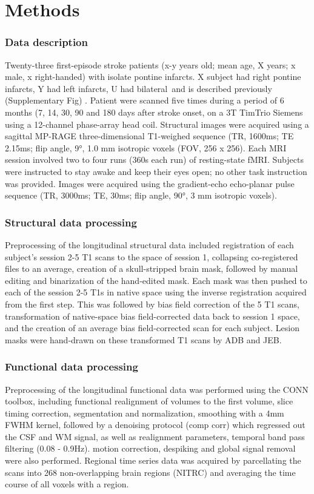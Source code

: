 \documentclass[10pt]{article}
\begin{document}
	\section*{Methods} \label{sec:firstpage}
	
	\subsubsection*{Data description}
	 Twenty-three first-episode stroke patients (x-y years old; mean age, X years; x male, x right-handed) with isolate pontine infarcts. X subject had right pontine infarcts, Y had left infarcts, U had bilateral and is described previously (Supplementary Fig) \cite{Lu2011-ow}. Patient were scanned five times during a period of 6 months (7, 14, 30, 90 and 180 days after stroke onset, on a 3T TimTrio Siemens using a 12-channel phase-array head coil. Structural images were acquired using a sagittal MP-RAGE three-dimensional T1-weighed sequence (TR, 1600ms; TE 2.15ms; flip angle, 9°, 1.0 mm isotropic voxels (FOV, 256 x 256). Each MRI session involved two to four runs (360s each run) of resting-state fMRI. Subjects were instructed to stay awake and keep their eyes open; no other task instruction was provided. Images were acquired using the gradient-echo echo-planar pulse sequence (TR, 3000ms; TE, 30ms; flip angle, 90°, 3 mm isotropic voxels).
	
	\subsubsection*{Structural data processing}
	Preprocessing of the longitudinal structural data included registration of each subject’s session 2-5 T1 scans to the space of session 1, collapsing co-registered files to an average, creation of a skull-stripped brain mask, followed by manual editing and binarization of the hand-edited mask. Each mask was then pushed to each of the session 2-5 T1s in native space using the inverse registration acquired from the first step. This was followed by bias field correction of the 5 T1 scans, transformation of native-space bias field-corrected data back to session 1 space, and the creation of an average bias field-corrected scan for each subject. Lesion masks were hand-drawn on these transformed T1 scans by ADB and JEB.
	
	\subsubsection*{Functional data processing}
	Preprocessing of the longitudinal functional data was performed using the CONN toolbox, including functional realignment of volumes to the first volume, slice timing correction, segmentation and normalization, smoothing with a 4mm FWHM kernel, followed by a denoising protocol (comp corr) which regressed out the CSF and WM signal, as well as realignment parameters, temporal band pass filtering (0.08 - 0.9Hz). motion correction, despiking and global signal removal were also performed. Regional time series data was acquired by parcellating the scans into 268 non-overlapping brain regions (NITRC) and averaging the time course of all voxels with a region.
	
\end{document}
